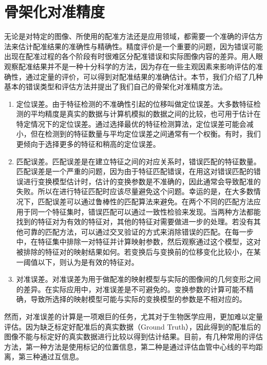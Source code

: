 \section{骨架化对准精度}

无论是对特定的图像、所使用的配准方法还是应用领域，都需要一个准确的评估方法来估计配准结果的准确性与精确性。精度评价是一个重要的问题，因为错误可能出现在配准过程的各个阶段有时很难区分配准错误和实际图像内容的差异。用人眼观察配准结果并不是一种十分科学的方法，因为存在一些主观因素来影响评估的准确性，通过定量的评价，可以得到对配准结果的准确估计。本节，我们介绍了几种基本的错误类型和评估方法\cite{barbara}并提出了我们自己的骨架化对准精度方法。


\begin{enumerate}
\item 定位误差。由于特征检测的不准确性引起的位移叫做定位误差。大多数特征检测的平均精度是真实的数据与计算机模拟的数据之间的比较，也可用于估计在特定情况下的定位误差。通过选择最优的特征检测算法，定位误差可能会减小，但在检测到的特征数量与平均定位误差之间通常有一个权衡。有时，我们更倾向于选择更多的特征和稍高的定位误差。

\item 匹配误差。匹配误差是在建立特征之间的对应关系时，错误匹配的特征数量。匹配误差是一个严重的问题，因为由于特征匹配错误，在用这对错误匹配的错误进行变换模型估计时，估计的变换参数是不准确的，因此通常会导致配准的失败。所以在进行特征匹配时应该尽量避免这个问题。幸运的是，在大多数情况下，匹配误差可以通过鲁棒性的匹配算法来避免。在两个不同的匹配方法应用于同一个特征集时，错误匹配可以通过一致性检验来发现。当两种方法都能找到的特征对为有效的特征对，其他的特征对需要做进一步的处理。若没有其他可靠的匹配方法，可以通过交叉验证的方式来消除错误的匹配。在每一步中，在特征集中排除一对特征并计算映射参数，然后观察通过这个模型，这对被排除的特征对的映射结果如何。若变换后与变换前的位移变化比较小，在某一阈值以下，则认为是有效的特征对。

\item 对准误差。对准误差为用于做配准的映射模型与实际的图像间的几何变形之间的差异。在实际应用中，对准误差是不可避免的。变换参数的计算可能不精确，导致所选择的映射模型可能与实际的变换模型的参数是不相对应的。

\end{enumerate}


然而，对准误差的计算是一项艰巨的任务，尤其对于生物医学应用，更加难以定量评估。因为缺乏标定好配准后的真实数据（Ground Truth），因此得到的配准后的图像不能与标定好的真实数据进行比较以得到估计结果。目前，有几种常用的评估方法，第一种方法是使用标记的位置信息，第二种是通过评估血管中心线的平均距离，第三种通过互信息\cite{kolar}。

